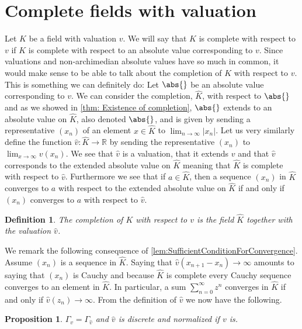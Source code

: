 \documentclass{article}
\newtheorem{definition}{Definition}[section]
\newtheorem{proposition}{Proposition}[section]
\newcommand{\mbb}[1]{\mathbb{#1}}
\numberwithin{equation}{section}
\begin{document}
\section{Complete fields with valuation}
Let $K$ be a field with valuation $v$. We will say that $K$ is complete with respect to $v$ if $K$ is complete with respect to an absolute value corresponding to $v$. Since valuations and non-archimedian absolute values have so much in common, it would make sense to be able to talk about the completion of $K$ with respect to $v$. This is something we can definitely do: Let $\abs{}$ be an absolute value corresponding to $v$. We can consider the completion, $\hat K$, with respect to $\abs{}$ and as we showed in \cref{thm: Existence of completion}, $\abs{}$ extends to an absolute value on $\hat K$, also denoted $\abs{}$, and is given by sending a representative $(x_n)$ of an element $x \in \hat K$ to $\lim_{n \to \infty} |x_n|$. Let us very similarly define the function $\hat v : \hat K \to \mbb R$ by sending the representative $(x_n)$ to $\lim_{x \to \infty} v(x_n)$. We see that $\hat v$ is a valuation, that it extends $v$ and that $\hat v$ corresponds to the extended absolute value on $\hat K$ meaning that $\hat K$ is complete with respect to $\hat v$. Furthermore we see that if $a \in \hat K$, then a sequence $(x_n)$ in $\hat K$ converges to $a$ with respect to the extended absolute value on $\hat K$ if and only if $(x_n)$ converges to $a$ with respect to $\hat v$.
\begin{definition}
	The completion of $K$ with respect to $v$ is the field $\hat K$ together with the valuation $\hat v$.
\end{definition}
We remark the following consequence of \cref{lem:SufficientConditionForConvergence}. Assume $(x_n)$ is a sequence in $\hat K$. Saying that $\hat v (x_{n+1} - x_n) \to \infty$ amounts to saying that $(x_n)$ is Cauchy and because $\hat K$ is complete every Cauchy sequence converges to an element in $\hat K$. In particular, a sum $\sum_{n = 0}^\infty z^n$ converges in $\hat K$ if and only if $\hat v(z_n) \to \infty$. From the definition of $\hat v$ we now have the following.
\begin{proposition}\label{K and completion of K have same value group}
	$\Gamma_v = \Gamma_{\hat v}$ and $\hat v$ is discrete and normalized if $v$ is.
\end{proposition}
\end{document}
